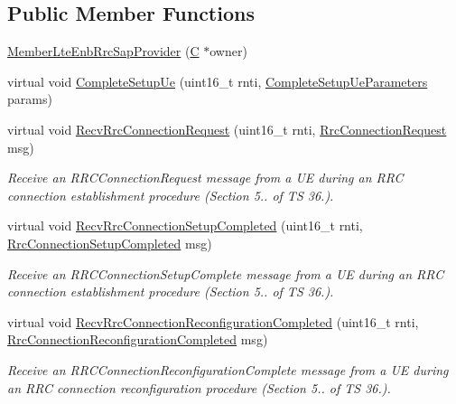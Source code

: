 \subsection*{Public Member Functions}
\begin{DoxyCompactItemize}
\item 
\hyperlink{classns3_1_1MemberLteEnbRrcSapProvider_a9caa83a1389ebc1484918df096204240}{Member\+Lte\+Enb\+Rrc\+Sap\+Provider} (\hyperlink{loss__COST231__small__cities__urban_8m_aaa53ca0b650dfd85c4f59fa156f7a2cc}{C} $\ast$owner)
\item 
virtual void \hyperlink{classns3_1_1MemberLteEnbRrcSapProvider_aef560df8c90c447b634a77f3ba2105af}{Complete\+Setup\+Ue} (uint16\+\_\+t rnti, \hyperlink{structns3_1_1LteEnbRrcSapProvider_1_1CompleteSetupUeParameters}{Complete\+Setup\+Ue\+Parameters} params)
\item 
virtual void \hyperlink{classns3_1_1MemberLteEnbRrcSapProvider_a3eba352248634038b0e27a62fbc4385c}{Recv\+Rrc\+Connection\+Request} (uint16\+\_\+t rnti, \hyperlink{structns3_1_1LteRrcSap_1_1RrcConnectionRequest}{Rrc\+Connection\+Request} msg)
\begin{DoxyCompactList}\small\item\em Receive an {\itshape R\+R\+C\+Connection\+Request} message from a UE during an R\+RC connection establishment procedure (Section 5.. of TS 36.). \end{DoxyCompactList}\item 
virtual void \hyperlink{classns3_1_1MemberLteEnbRrcSapProvider_a784e7beed9c64d469ce831d611b8ec31}{Recv\+Rrc\+Connection\+Setup\+Completed} (uint16\+\_\+t rnti, \hyperlink{structns3_1_1LteRrcSap_1_1RrcConnectionSetupCompleted}{Rrc\+Connection\+Setup\+Completed} msg)
\begin{DoxyCompactList}\small\item\em Receive an {\itshape R\+R\+C\+Connection\+Setup\+Complete} message from a UE during an R\+RC connection establishment procedure (Section 5.. of TS 36.). \end{DoxyCompactList}\item 
virtual void \hyperlink{classns3_1_1MemberLteEnbRrcSapProvider_a38fe57992c93600c047d2ba5232d0083}{Recv\+Rrc\+Connection\+Reconfiguration\+Completed} (uint16\+\_\+t rnti, \hyperlink{structns3_1_1LteRrcSap_1_1RrcConnectionReconfigurationCompleted}{Rrc\+Connection\+Reconfiguration\+Completed} msg)
\begin{DoxyCompactList}\small\item\em Receive an {\itshape R\+R\+C\+Connection\+Reconfiguration\+Complete} message from a UE during an R\+RC connection reconfiguration procedure (Section 5.. of TS 36.). \end{DoxyCompactList}\item 

\end{DoxyCompactItemize}
